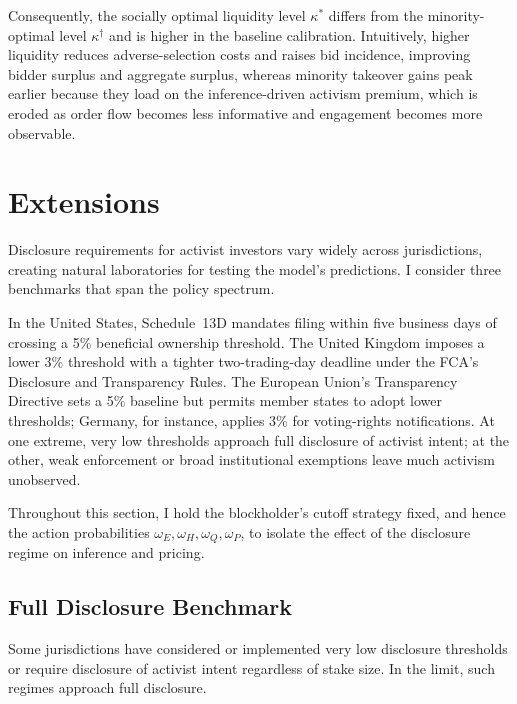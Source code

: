 \documentclass[11pt]{article}
\newcommand{\1}{\mathbf{1}}
\begin{document}
Consequently, the socially optimal liquidity level $\kappa^*$ differs from the minority-optimal level $\kappa^\dagger$ and is higher in the baseline calibration. Intuitively, higher liquidity reduces adverse-selection costs and raises bid incidence, improving bidder surplus and aggregate surplus, whereas minority takeover gains peak earlier because they load on the inference-driven activism premium, which is eroded as order flow becomes less informative and engagement becomes more observable.

\section{Extensions}
\label{sec:extensions}

Disclosure requirements for activist investors vary widely across jurisdictions, creating natural laboratories for testing the model's predictions. I consider three benchmarks that span the policy spectrum.

In the United States, Schedule~13D mandates filing within five business days of crossing a 5\% beneficial ownership threshold. The United Kingdom imposes a lower 3\% threshold with a tighter two-trading-day deadline under the FCA's Disclosure and Transparency Rules. The European Union's Transparency Directive sets a 5\% baseline but permits member states to adopt lower thresholds; Germany, for instance, applies 3\% for voting-rights notifications. At one extreme, very low thresholds approach full disclosure of activist intent; at the other, weak enforcement or broad institutional exemptions leave much activism unobserved.

Throughout this section, I hold the blockholder's cutoff strategy fixed, and hence the action probabilities $\omega_E,\omega_H,\omega_Q,\omega_P$, to isolate the effect of the disclosure regime on inference and pricing.

%
\subsection{Full Disclosure Benchmark}
%

Some jurisdictions have considered or implemented very low disclosure thresholds or require disclosure of activist intent regardless of stake size. In the limit, such regimes approach full disclosure.
\end{document}
